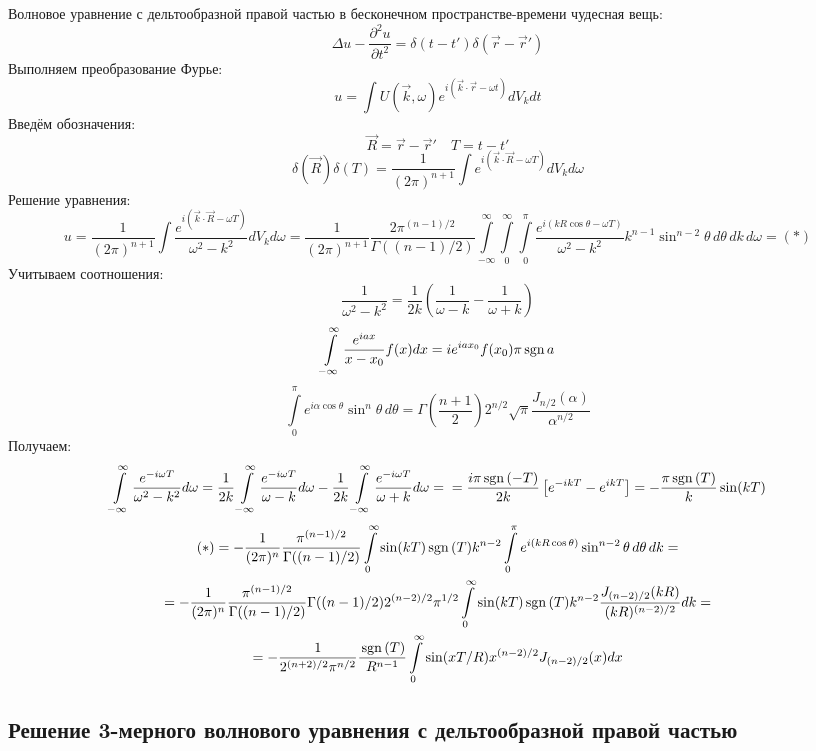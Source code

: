 Волновое уравнение с дельтообразной правой частью в бесконечном пространстве-времени чудесная вещь:
\[
	\Delta u - \frac{\partial^2 u}{\partial t^2} = \delta(t - t')\delta(\vec{r} - \vec{r}') 
\]
Выполняем преобразование Фурье:
\[
	u = \int U(\vec{k}, \omega) e^{i(\vec{k}\cdot\vec{r} - \omega t)} dV_k dt
\]
Введём обозначения:
\[
	\vec{R} = \vec{r} - \vec{r}' \quad T = t - t'
\]
\[
	\delta(\vec{R}) \delta(T) = \frac{1}{(2\pi)^{n + 1}} \int e^{i(\vec{k}\cdot\vec{R} - \omega T)} dV_k d\omega
\]
Решение уравнения:
\[
	u = \frac{1}{(2\pi)^{n + 1}} \int \frac{e^{i(\vec{k}\cdot\vec{R} - \omega T)}}{\omega^2 - k^2} dV_k d\omega =  
	\frac{1}{(2\pi)^{n + 1}} \frac{2 \pi^{(n - 1)/2}}{\Gamma((n - 1)/2)} 
	\int\limits_{-\infty}^{\infty}\!
	\int\limits_{0}^{\infty}\!
	\int\limits_{0}^{\pi}
	 \frac{e^{i(k R \cos \theta - \omega T)}}{\omega^2 - k^2} k^{n - 1} \sin^{n - 2} \theta\, d\theta\, dk\, d\omega = (*)
\]
Учитываем соотношения:
\[
	\frac{1}{\omega^2 - k^2} = \frac{1}{2k} \left(\frac{1}{\omega - k} - \frac{1}{\omega + k} \right)
\]
\[
	\int\limits_{-\infty}^{\infty} \frac{e^{ia x}}{x - x_0} f(x) dx =
	i e^{iax_0} f(x_0) \pi \mathrm{\,sgn}\, a
\]
\[
	\int\limits_0^\pi e^{i\alpha \cos \theta} \sin^n \theta \, d\theta
	=
	\Gamma \left(\dfrac{n + 1}{2}\right) 2^{n/2} \sqrt{\pi} \frac{J_{n/2} (\alpha)}{\alpha^{n/2}}  
\]
Получаем:
\[
	\int\limits_{-\infty}^{\infty} \frac{e^{ - i\omega T}}{\omega^2 - k^2} d\omega 
	=
	\frac{1}{2k} \int\limits_{-\infty}^{\infty} \frac{e^{ - i\omega T}}{\omega - k} d\omega
	-
	\frac{1}{2k} \int\limits_{-\infty}^{\infty} \frac{e^{ - i\omega T}}{\omega + k} d\omega
	= \\ =
	\frac{i\pi \mathrm{\,sgn}\, (-T)}{2k} \left[e^{-i k T} - e^{ikT}\right]
	=
	- \frac{\pi \mathrm{\,sgn}\, (T)}{k} \sin (kT)
\]
\[
	\begin{gathered}
	(*) =
	- \frac{1}{(2\pi)^{n}} \frac{\pi^{(n - 1)/2}}{\Gamma((n - 1)/2)} 
	\int\limits_{0}^{\infty}
	\sin (kT) \mathrm{\,sgn}\,(T) k^{n - 2} 
	\int\limits_{0}^{\pi}
	e^{i(k R \cos \theta)} 
	\sin^{n - 2} \theta\, d\theta\, dk
	= \\ =
	- \frac{1}{(2\pi)^{n}} \frac{\pi^{(n - 1)/2}}{\Gamma((n - 1)/2)} 
	\Gamma((n - 1)/2) 2^{(n - 2)/2} \pi^{1/2}
	\int\limits_{0}^{\infty}
	\sin (kT) \mathrm{\,sgn}\,(T) k^{n - 2} 
	\frac{J_{(n - 2)/2} (kR)}{(kR)^{(n - 2)/2}}   dk
	= \\ =
	- \frac{1}{2^{(n + 2)/2} \pi^{n/2}} \frac{\mathrm{\,sgn}\,(T)}{R^{n - 1}}
	\int\limits_{0}^{\infty}
	\sin (xT/R) x^{(n - 2)/2} 
	J_{(n - 2)/2} (x)   dx
	\end{gathered} 
\]


\subsection{Решение 3-мерного волнового уравнения с дельтообразной правой частью}

